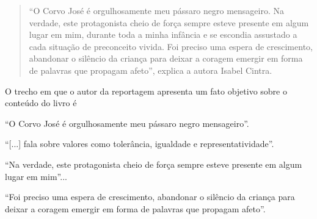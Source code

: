 \begin{escolha}
\begin{escolha}
\begin{escolha}
{\begin{quote}
``O Corvo José é orgulhosamente meu pássaro negro mensageiro. Na
verdade, este protagonista cheio de força sempre esteve presente em
algum lugar em mim, durante toda a minha infância e se escondia
assustado a cada situação de preconceito vivida. Foi preciso uma espera
de crescimento, abandonar o silêncio da criança para deixar a coragem
emergir em forma de palavras que propagam afeto'', explica a autora
Isabel Cintra.

\end{quote}

O trecho em que o autor da reportagem apresenta um fato objetivo sobre
o conteúdo do livro é

\begin{escolha}
\item ``O Corvo José é orgulhosamente meu pássaro negro mensageiro''.

\item ``{[}...{]} fala sobre
valores como tolerância, igualdade e representatividade''.

\item ``Na verdade, este protagonista cheio de força sempre esteve
presente em algum lugar em mim''...

\item ``Foi preciso uma espera de crescimento, abandonar o silêncio da
criança para deixar a coragem emergir em forma de palavras que propagam
afeto''.
\end{escolha}


}
\end{escolha}
\end{escolha}
\end{escolha}
